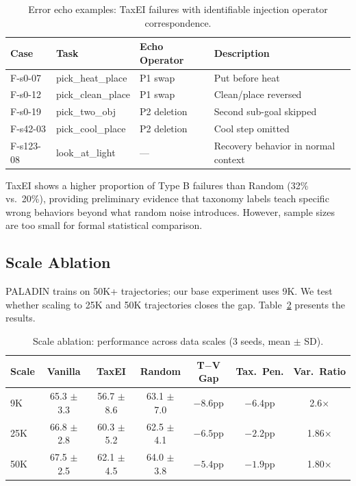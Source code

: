 \documentclass[11pt,a4paper]{article}
\begin{document}
\begin{table}[t]
\centering
\small
\caption{Error echo examples: TaxEI failures with identifiable injection operator correspondence.}
\label{tab:echoes}
\begin{tabular}{llll}
\toprule
\textbf{Case} & \textbf{Task} & \textbf{Echo Operator} & \textbf{Description} \\
\midrule
F-s0-07 & pick\_heat\_place & P1 swap & Put before heat \\
F-s0-12 & pick\_clean\_place & P1 swap & Clean/place reversed \\
F-s0-19 & pick\_two\_obj & P2 deletion & Second sub-goal skipped \\
F-s42-03 & pick\_cool\_place & P2 deletion & Cool step omitted \\
F-s123-08 & look\_at\_light & --- & Recovery behavior in normal context \\
\bottomrule
\end{tabular}
\end{table}

TaxEI shows a higher proportion of Type B failures than Random (32\% vs.\ 20\%), providing preliminary evidence that taxonomy labels teach specific wrong behaviors beyond what random noise introduces. However, sample sizes are too small for formal statistical comparison.

\subsection{Scale Ablation}
\label{sec:scale}

PALADIN trains on 50K+ trajectories; our base experiment uses 9K. We test whether scaling to 25K and 50K trajectories closes the gap. Table~\ref{tab:scale} presents the results.

\begin{table}[t]
\centering
\small
\caption{Scale ablation: performance across data scales (3 seeds, mean $\pm$ SD).}
\label{tab:scale}
\begin{tabular}{lcccccc}
\toprule
\textbf{Scale} & \textbf{Vanilla} & \textbf{TaxEI} & \textbf{Random} & \textbf{T$-$V Gap} & \textbf{Tax.\ Pen.} & \textbf{Var.\ Ratio} \\
\midrule
9K & 65.3 $\pm$ 3.3 & 56.7 $\pm$ 8.6 & 63.1 $\pm$ 7.0 & $-8.6$pp & $-6.4$pp & 2.6$\times$ \\
25K & 66.8 $\pm$ 2.8 & 60.3 $\pm$ 5.2 & 62.5 $\pm$ 4.1 & $-6.5$pp & $-2.2$pp & 1.86$\times$ \\
50K & 67.5 $\pm$ 2.5 & 62.1 $\pm$ 4.5 & 64.0 $\pm$ 3.8 & $-5.4$pp & $-1.9$pp & 1.80$\times$ \\
\bottomrule
\end{tabular}
\end{table}
\end{document}
